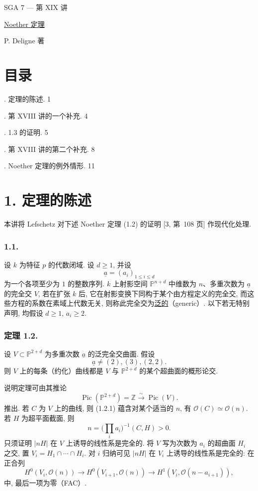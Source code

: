 \clearpage
\ExposeTOC
\begin{center}
{\large SGA 7 --- 第 XIX 讲}\par
\vspace{2em}
{\Large\underline{Noether 定理}}\par
\vspace{1.5em}
{\large P. Deligne 著}
\end{center}

\section*{目录}

. 定理的陈述. \hfill 1

. 第 XVIII 讲的一个补充. \hfill 4

. 1.3 的证明. \hfill 5

. 第 XVIII 讲的第二个补充. \hfill 8

. Noether 定理的例外情形. \hfill 11

\section*{1. 定理的陈述}

本讲将 Lefschetz 对下述 Noether 定理 (1.2) 的证明 [3, 第~108 页] 作现代化处理.

\subsubsection*{1.1.}
设 $k$ 为特征 $p$ 的代数闭域. 设 $d\geq1$, 并设
\[
\underline a=(a_i)_{1\leq i\leq d}
\]
为一个各项至少为 $1$ 的整数序列. $k$ 上射影空间 $\mathbb P^{n+d}$ 中维数为 $n$、多重次数为 $\underline a$ 的完全交 $V$, 若在扩张 $k$ 后, 它在射影变换下同构于某个由方程定义的完全交, 而这些方程的系数在素域上代数无关, 则称此完全交为\underline{泛的}（generic）. 以下若无特别声明, 均假设 $d\geq1$, $a_i\geq2$.

\subsubsection*{定理 1.2.}
设 $V\subset\mathbb P^{2+d}$ 为多重次数 $\underline a$ 的泛完全交曲面. 假设
\[
\underline a\ne(2),(3),(2,2).
\]
则 $V$ 上的每条（约化）曲线都是 $V$ 与 $\mathbb P^{2+d}$ 的某个超曲面的概形论交.

说明定理可由其推论
\begin{equation}\tag{1.2.1}
\operatorname{Pic}(\mathbb P^{2+d})=\mathbb Z
\xrightarrow{\ \sim\ }\operatorname{Pic}(V).
\end{equation}
推出. 若 $C$ 为 $V$ 上的曲线, 则 (1.2.1) 蕴含对某个适当的 $n$, 有 $\mathcal O(C)\simeq\mathcal O(n)$. 若 $H$ 为超平面截面, 则
\[
n=\bigl(\textstyle\prod_i a_i\bigr)^{-1}(C,H)>0.
\]
只须证明 $|nH|$ 在 $V$ 上诱导的线性系是完全的. 将 $V$ 写为次数为 $a_i$ 的超曲面 $H_i$ 之交, 置 $V_i=H_1\cap\cdots\cap H_i$. 对 $i$ 归纳可见 $|nH|$ 在 $V_i$ 上诱导的线性系是完全的: 在正合列
\[
H^0(V_i,\mathcal O(n))\longrightarrow
H^0(V_{i+1},\mathcal O(n))\longrightarrow
H^1(V_i,\mathcal O(n-a_{i+1})),
\]
中, 最后一项为零（FAC）.

